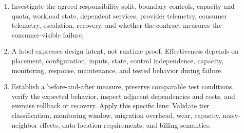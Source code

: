 \documentclass[11pt]{article}
\begin{document}
\begin{enumerate}
\item Investigate the agreed responsibility split, boundary controls, capacity and quota, workload state, dependent services, provider telemetry, consumer telemetry, escalation, recovery, and whether the contract measures the consumer-visible failure.
\item A label expresses design intent, not runtime proof. Effectiveness depends on placement, configuration, inputs, state, control independence, capacity, monitoring, response, maintenance, and tested behavior during failure.
\item Establish a before-and-after measure, preserve comparable test conditions, verify the expected behavior, inspect adjacent dependencies and costs, and exercise rollback or recovery. Apply this specific lens: Validate tier classification, monitoring window, migration overhead, wear, capacity, noisy-neighbor effects, data-location requirements, and billing semantics.
\end{enumerate}
\end{document}
